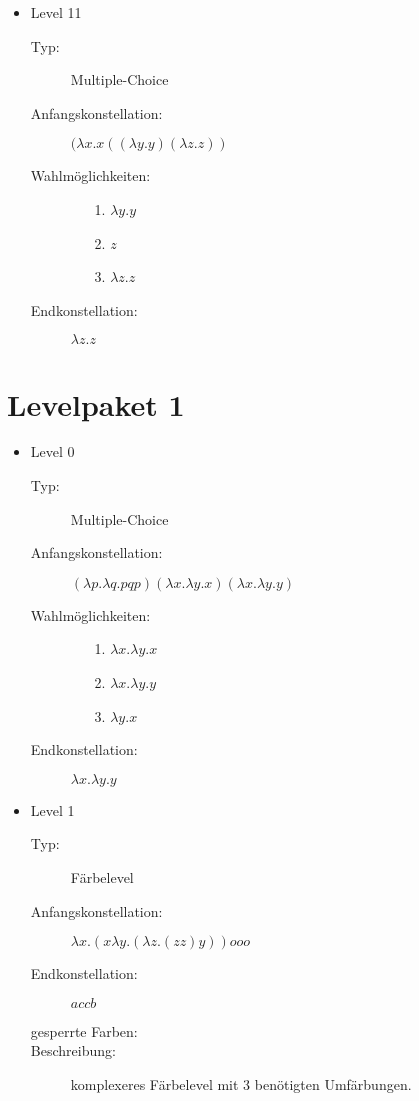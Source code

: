 \documentclass[parskip=full]{scrreprt}
\begin{document}
\begin{itemize}
	\item{Level 11} 
		\begin{description}
			\item[Typ:] Multiple-Choice 
			\item[Anfangskonstellation:] \((\lambda x . x ((\lambda y . y) (\lambda z . z ) ) \)    
			\item[Wahlmöglichkeiten:] \hfill
				\begin{itemize}
					\item[1.] \( \lambda y . y\) 
					\item[2.] \( z \) 
					\item[3.] \(\lambda z . z \)
				\end{itemize}
			\item[Endkonstellation:]\( \lambda z . z\)
		\end{description}


\end{itemize}
\chapter{Levelpaket 1}
\begin{itemize}

	\item{Level 0}
		\begin{description}
			\item[Typ:] Multiple-Choice 
			\item[Anfangskonstellation:] \((\lambda p .\lambda q . p q p ) (\lambda x . \lambda y . x ) (\lambda x . \lambda y . y )  \)    
			\item[Wahlmöglichkeiten:] \hfill
				\begin{itemize}
					\item[1.] \(\lambda x . \lambda y . x \) 
					\item[2.] \(\lambda x . \lambda y . y \)
					\item[3.] \(\lambda y . x \)
				\end{itemize}
			\item[Endkonstellation:]\(\lambda x . \lambda y . y \)
		\end{description}

	\item{Level 1}
		\begin{description} 
		\item[Typ:] Färbelevel 
		\item[Anfangskonstellation:] \(\lambda x . ( x \lambda y .  ( \lambda z . (z z) y )  )  o o o\)   
		\item[Endkonstellation:] \(a c c b\) 
		\item[gesperrte Farben:]  
		\item[Beschreibung:] komplexeres Färbelevel mit 3 benötigten Umfärbungen. 

		\end{description}
	
\end{itemize}
\end{document}
